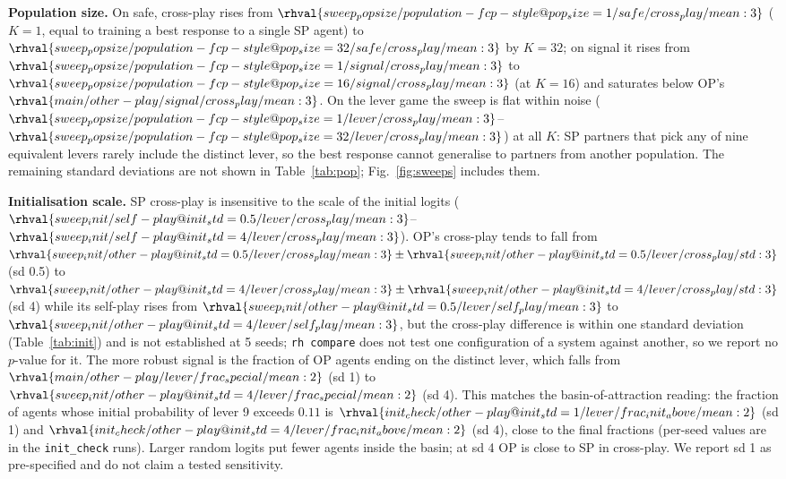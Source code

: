 \textbf{Population size.} On safe, cross-play rises from $\rhval{sweep_popsize/population-fcp-style@pop_size=1/safe/cross_play/mean:3}$ ($K=1$, equal to training a best response to a single SP agent) to $\rhval{sweep_popsize/population-fcp-style@pop_size=32/safe/cross_play/mean:3}$ by $K=32$; on signal it rises from $\rhval{sweep_popsize/population-fcp-style@pop_size=1/signal/cross_play/mean:3}$ to $\rhval{sweep_popsize/population-fcp-style@pop_size=16/signal/cross_play/mean:3}$ (at $K=16$) and saturates below OP's $\rhval{main/other-play/signal/cross_play/mean:3}$. On the lever game the sweep is flat within noise ($\rhval{sweep_popsize/population-fcp-style@pop_size=1/lever/cross_play/mean:3}$--$\rhval{sweep_popsize/population-fcp-style@pop_size=32/lever/cross_play/mean:3}$) at all $K$: SP partners that pick any of nine equivalent levers rarely include the distinct lever, so the best response cannot generalise to partners from another population. The remaining standard deviations are not shown in Table~\ref{tab:pop}; Fig.~\ref{fig:sweeps} includes them.

\begin{table}[t]\centering\caption{Initial logit std sweep, lever game (5 seeds per cell; sd 1 is the main configuration).}\label{tab:init}
\resizebox{\columnwidth}{!}{}\end{table}

\textbf{Initialisation scale.} SP cross-play is insensitive to the scale of the initial logits ($\rhval{sweep_init/self-play@init_std=0.5/lever/cross_play/mean:3}$--$\rhval{sweep_init/self-play@init_std=4/lever/cross_play/mean:3}$). OP's cross-play tends to fall from $\rhval{sweep_init/other-play@init_std=0.5/lever/cross_play/mean:3}\pm\rhval{sweep_init/other-play@init_std=0.5/lever/cross_play/std:3}$ (sd 0.5) to $\rhval{sweep_init/other-play@init_std=4/lever/cross_play/mean:3}\pm\rhval{sweep_init/other-play@init_std=4/lever/cross_play/std:3}$ (sd 4) while its self-play rises from $\rhval{sweep_init/other-play@init_std=0.5/lever/self_play/mean:3}$ to $\rhval{sweep_init/other-play@init_std=4/lever/self_play/mean:3}$, but the cross-play difference is within one standard deviation (Table~\ref{tab:init}) and is not established at 5 seeds; \texttt{rh compare} does not test one configuration of a system against another, so we report no $p$-value for it. The more robust signal is the fraction of OP agents ending on the distinct lever, which falls from $\rhval{main/other-play/lever/frac_special/mean:2}$ (sd 1) to $\rhval{sweep_init/other-play@init_std=4/lever/frac_special/mean:2}$ (sd 4). This matches the basin-of-attraction reading: the fraction of agents whose initial probability of lever 9 exceeds $0.11$ is $\rhval{init_check/other-play@init_std=1/lever/frac_init_above/mean:2}$ (sd 1) and $\rhval{init_check/other-play@init_std=4/lever/frac_init_above/mean:2}$ (sd 4), close to the final fractions (per-seed values are in the \texttt{init\_check} runs). Larger random logits put fewer agents inside the basin; at sd 4 OP is close to SP in cross-play. We report sd 1 as pre-specified and do not claim a tested sensitivity.


